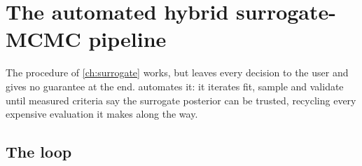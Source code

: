 \chapter{The automated hybrid surrogate-MCMC pipeline}
\label{ch:hybrid}

The procedure of \cref{ch:surrogate} works, but leaves every decision to the user and gives no
guarantee at the end.  automates it: it iterates fit, sample and validate
until measured criteria say the surrogate posterior can be trusted, recycling every expensive
evaluation it makes along the way.

\section{The loop}
\label{sec:hybrid-loop}

